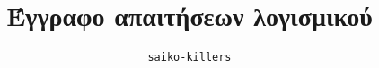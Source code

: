 \documentclass[]{template}
\title{Έγγραφο απαιτήσεων λογισμικού}
\author{\texttt{saiko-killers}}
\begin{document}
	\maketitlepage
	
	
	\newpage
	
	\newpage
	
	\newpage
	
\end{document}
